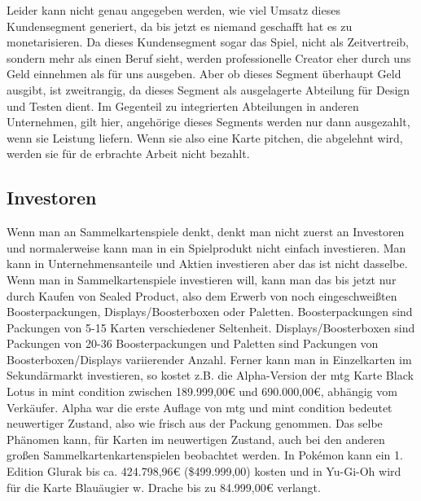 \documentclass[fontsize=11, a4aper]{scrartcl}
\begin{document}
\noindent Leider kann nicht genau angegeben werden, wie viel Umsatz dieses Kundensegment generiert, da bis jetzt es niemand geschafft hat es zu monetarisieren. Da dieses Kundensegment sogar das Spiel, nicht als Zeitvertreib, sondern mehr als einen Beruf sieht, werden professionelle Creator eher durch uns Geld einnehmen als für uns ausgeben. Aber ob dieses Segment überhaupt Geld ausgibt, ist zweitrangig, da dieses Segment als ausgelagerte Abteilung für Design und Testen dient. Im Gegenteil zu integrierten Abteilungen in anderen Unternehmen, gilt hier, angehörige dieses Segments werden nur dann ausgezahlt, wenn sie Leistung liefern. Wenn sie also eine Karte pitchen, die abgelehnt wird, werden sie für de erbrachte Arbeit nicht bezahlt.

\subsection{Investoren} \label{subsec:Investoren}

Wenn man an Sammelkartenspiele denkt, denkt man nicht zuerst an Investoren und normalerweise kann man in ein Spielprodukt nicht einfach investieren. Man kann in Unternehmensanteile und Aktien investieren aber das ist nicht dasselbe. Wenn man in Sammelkartenspiele investieren will, kann man das bis jetzt nur durch Kaufen von \glqq Sealed Product\grqq{}, also dem Erwerb von noch eingeschweißten Boosterpackungen, Displays/Boosterboxen oder Paletten. Boosterpackungen sind Packungen von 5-15 Karten verschiedener Seltenheit. Displays/Boosterboxen sind Packungen von 20-36 Boosterpackungen und Paletten sind Packungen von Boosterboxen/Displays variierender Anzahl. Ferner kann man in Einzelkarten im Sekundärmarkt investieren, so kostet z.B. die Alpha-Version der \ac{mtg} Karte \glqq Black Lotus\grqq{} in \glqq mint condition \grqq{} zwischen 189.999,00€ und 690.000,00€, abhängig vom Verkäufer. Alpha war die erste Auflage von \acl{mtg} und \glqq mint condition\grqq{} bedeutet \glqq neuwertiger Zustand\grqq, also wie frisch aus der Packung genommen. Das selbe Phänomen kann, für Karten im neuwertigen Zustand, auch bei den anderen großen Sammelkartenkartenspielen beobachtet werden. In Pok\'emon kann ein 1. Edition \glqq Glurak\grqq{} bis ca. 424.798,96€ (\$499.999,00) kosten und in Yu-Gi-Oh wird für die Karte \glqq Blauäugier w. Drache\grqq{} bis zu 84.999,00€ verlangt.\hfill\newline
\end{document}
